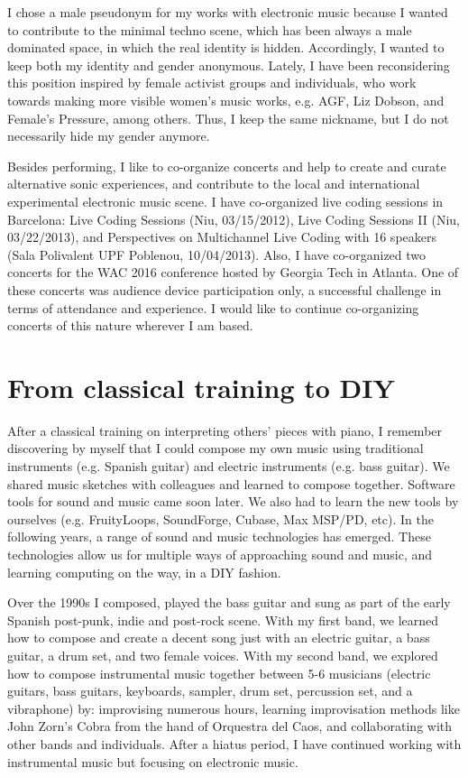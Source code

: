 \documentclass[10pt, a4paper]{article}
\begin{document}
I chose a male pseudonym for my works with electronic music because I wanted to contribute to the minimal techno scene, which has been always a male dominated space, in which the real identity is hidden. Accordingly, I wanted to keep both my identity and gender anonymous. Lately, I have been reconsidering this position inspired by female activist groups and individuals, who work towards making more visible women's music works, e.g. AGF, Liz Dobson, and Female's Pressure, among others. Thus, I keep the same nickname, but I do not necessarily hide my gender anymore.

Besides performing, I like to co-organize concerts and help to create and curate alternative sonic experiences, and contribute to the local and international experimental electronic music scene. I have co-organized live coding sessions in Barcelona: Live Coding Sessions (Niu, 03/15/2012), Live Coding Sessions II (Niu, 03/22/2013), and Perspectives on Multichannel Live Coding with 16 speakers (Sala Polivalent UPF Poblenou, 10/04/2013). Also, I have co-organized two concerts for the WAC 2016 conference hosted by Georgia Tech in Atlanta. One of these concerts was audience device participation only, a successful challenge in terms of attendance and experience. I would like to continue co-organizing concerts of this nature wherever I am based.

\section*{From classical training to DIY}

After a classical training on interpreting others' pieces with piano, I remember discovering by myself that I could compose my own music using traditional instruments (e.g. Spanish guitar) and electric instruments (e.g. bass guitar). We shared music sketches with colleagues and learned to compose together. Software tools for sound and music came soon later. We also had to learn the new tools by ourselves (e.g. FruityLoops, SoundForge, Cubase, Max MSP/PD, etc). In the following years, a range of sound and music technologies has emerged. These technologies allow us for multiple ways of approaching sound and music, and learning computing on the way, in a DIY fashion.   

Over the 1990s I composed, played the bass guitar and sung as part of the early Spanish post-punk, indie and post-rock scene. With my first band, we learned how to compose and create a decent song just with an electric guitar, a bass guitar, a drum set, and two female voices. With my second band, we explored how to compose instrumental music together between 5-6 musicians (electric guitars, bass guitars, keyboards, sampler, drum set, percussion set, and a vibraphone) by: improvising numerous hours, learning improvisation methods like John Zorn's Cobra from the hand of Orquestra del Caos, and collaborating with other bands and individuals. After a hiatus period, I have continued working with instrumental music but focusing on electronic music. 
\end{document}
